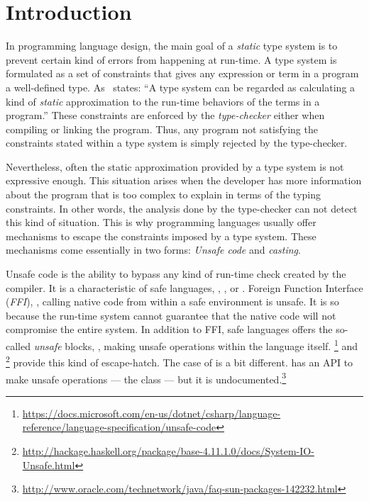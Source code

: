 
\chapter{Introduction}

In programming language design, the main goal of a \emph{static} type system is to prevent certain kind of errors from happening at run-time.
A type system is formulated as a set of constraints that gives any expression or term in a program a well-defined type.
As~\cite{pierceTypesProgrammingLanguages2002} states: ``A type system can be regarded as calculating a kind of \emph{static} approximation to the run-time behaviors of the terms in a program.''
These constraints are enforced by the \emph{type-checker} either when compiling or linking the program.
Thus, any program not satisfying the constraints stated within a type system is simply rejected by the type-checker.

Nevertheless, often the static approximation provided by a type system is not expressive enough.
This situation arises when the developer has more information about the program that is too complex to explain in terms of the typing constraints.
In other words, the analysis done by the type-checker can not detect this kind of situation.
This is why programming languages usually offer mechanisms to escape the constraints imposed by a type system.
These mechanisms come essentially in two forms: \emph{Unsafe code} and \emph{casting}.

Unsafe code is the ability to bypass any kind of run-time check created by the compiler.
It is a characteristic of safe languages, \eg{}, ,  or .
Foreign Function Interface (\emph{FFI}), \ie{}, calling native code from within a safe environment is unsafe.
It is so because the run-time system cannot guarantee that the native code will not compromise the entire system.
In addition to FFI, safe languages offers the so-called \emph{unsafe} blocks, \ie{}, making unsafe operations within the language itself.
\footnote{\url{https://docs.microsoft.com/en-us/dotnet/csharp/language-reference/language-specification/unsafe-code}}
and \footnote{\url{http://hackage.haskell.org/package/base-4.11.1.0/docs/System-IO-Unsafe.html}}
provide this kind of escape-hatch.
The case of  is a bit different.
 has an API to make unsafe operations --- the  class --- 
but it is undocumented.\footnote{\url{http://www.oracle.com/technetwork/java/faq-sun-packages-142232.html}}

